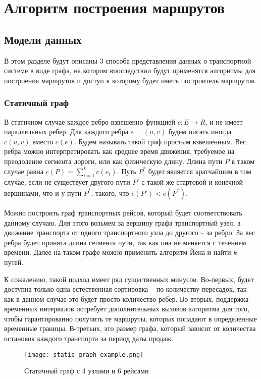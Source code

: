 \chapter{Алгоритм построения маршрутов}

\section{Модели данных}
В этом разделе будут описаны 3 способа представления данных о транспортной системе в виде графа, на котором впоследствии будут применятся алгоритмы для построения маршрутов и доступ к которому будет иметь построитель маршрутов.
\subsection{Статичный граф}
В статичном случае каждое ребро взвешенно функцией $c:E \rightarrow R$, и не имеет параллельных ребер. Для каждого ребра $e=(u, v)$ будем писать иногда $c(u, v)$ вместо $c(e)$. Будем называть такой граф простым взвешенным. Вес ребра можно интерпретировать как среднее время движения, требуемое на преодоление сегмента дороги, или как физическую длину. Длина пути $P$ в таком случае равна $c(P)=\sum_{i=1}^{k}c(e_i)$. Путь $P^*$ будет является кратчайшим в том случае, если не существует другого пути $P'$ с такой же стартовой и конечной вершинами, что и у пути $P^*$, такого, что $c(P')<c(P^*)$.

Можно построить граф транспортных рейсов, который будет соответствовать данному случаю. Для этого возьмем за вершину графа транспортный узел, а движение транспорта от одного транспортного узла до другого -- за ребро. За вес ребра будет принята длина сегмента пути, так как она не меняется с течением времени. Далее на таком графе можно применить алгоритм Йена и найти $k$ путей.

К сожалению, такой подход имеет ряд существенных минусов. Во-первых, будет доступна только одна естественная сортировка -- по количеству пересадок, так как в данном случае это будет просто количество ребер. Во-вторых, поддержка временных интервалов потребует дополнительных вызовов алгоритма для того, чтобы гарантированно получить те маршруты, которых попадают в определенные временные границы. В-третьих, это размер графа, который зависит от количества остановок каждого транспорта за период даты продаж.

\begin{figure}[!h]
	\centering
	\texttt{[image: static\_graph\_example.png]}
	\caption{Статичный граф с 4 узлами и 6 рейсами}\label{fig3}
\end{figure}
\FloatBarrier

